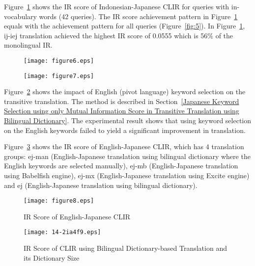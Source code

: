 \documentclass[english]{jnlp_1.3c}
\begin{document}
Figure~\ref{fig:6} shows the IR score of
Indonesian-Japanese CLIR for queries with in-vocabulary words (42
queries). The IR score achievement pattern in Figure~\ref{fig:6} equals
with the achievement pattern for all queries (Figure~\ref{fig:5}). In
Figure~\ref{fig:6}, ij-iej translation achieved the highest IR score of
0.0555 which is 56\% of the monolingual IR.

\begin{figure}[b]
  \begin{center}
    \texttt{[image: figure6.eps]}
  \end{center}
  \label{fig:6}
\end{figure}

\begin{figure}[t]
 \begin{center}
   \texttt{[image: figure7.eps]}
 \end{center}
 \label{fig:7}
\end{figure}

Figure~\ref{fig:7} shows the impact of English (pivot language) keyword
selection on the transitive translation. The method is described in
Section~\ref{Japanese Keyword Selection using only Mutual Information
Score in Transitive Translation using Bilingual Dictionary}. The
experimental result shows that using keyword selection on the English
keywords failed to yield a significant improvement in translation.

Figure~\ref{fig:8} shows the IR score of English-Japanese CLIR, which
has 4 translation groups: ej-man (English-Japanese translation using
bilingual dictionary where the English keywords are selected manually),
ej-mb (English-Japanese translation using Babelfish engine), ej-mx
(English-Japanese translation using Excite engine) and ej
(English-Japanese translation using bilingual dictionary).

\begin{figure}[t]
 \begin{center}
   \texttt{[image: figure8.eps]}
 \end{center}
 \caption{IR Score of English-Japanese CLIR}
 \label{fig:8}
\end{figure}
\begin{figure}[t]
 \begin{center}
       \texttt{[image: 14-2ia4f9.eps]}
 \end{center}
 \caption{IR Score of CLIR using Bilingual Dictionary-based Translation
 and its Dictionary Size}
 \label{fig:9}
\end{figure}
\end{document}

